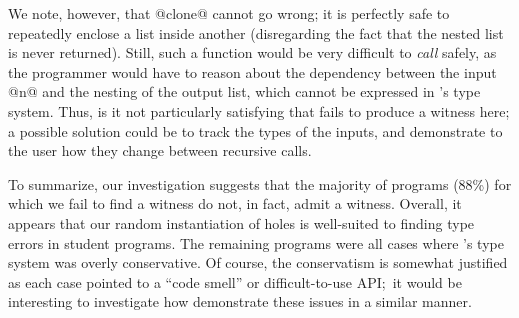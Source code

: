 We note, however, that @clone@ cannot go wrong; it is perfectly safe to
repeatedly enclose a list inside another (disregarding the fact that the
nested list is never returned).
%
Still, such a function would be very difficult to \emph{call} safely, as
the programmer would have to reason about the dependency between the
input @n@ and the nesting of the output list, which cannot be expressed
in \ocaml's type system.
%
Thus, is it not particularly satisfying that \toolname fails to produce
a witness here; a possible solution could be to track the types of the
inputs, and demonstrate to the user how they change between recursive
calls.


To summarize, our investigation suggests that the majority of programs
(88\%) for which we fail to find a witness do not, in fact, admit a
witness.
%
Overall, it appears that our random instantiation of holes is well-suited
to finding type errors in student programs.
%
The remaining programs were all cases where \ocaml's type system was
overly conservative.
%
Of course, the conservatism is somewhat justified as each case pointed
to a ``code smell'' or difficult-to-use API;\ it would be interesting to
investigate how demonstrate these issues in a similar manner.

